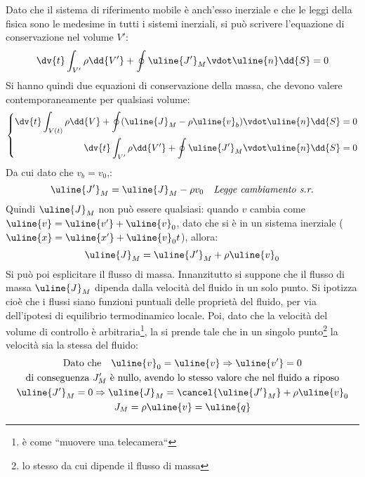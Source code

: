 Dato che il sistema di riferimento mobile è anch'esso inerziale e che le leggi della fisica sono le medesime in tutti i sistemi inerziali, si può scrivere l'equazione di conservazione nel volume $V'$:
%
	\begin{equation*}
		\dv{t} \int_{V'} \rho \dd{V'} + \oint \uline{J'}_M \vdot \uline{n} \dd{S} = 0
	\end{equation*}
%
Si hanno quindi due equazioni di conservazione della massa, che devono valere contemporaneamente per qualsiasi volume:
%
	\begin{equation*}
		\begin{gathered}
		\left\{
			\begin{aligned}
				\dv{t} \int_{V(t)} \rho \dd{V} + \oint (\uline{J}_M - \rho \uline{v}_b) \vdot \uline{n} \dd{S} = 0\\
				\dv{t} \int_{V'} \rho \dd{V'} + \oint \uline{J'}_M \vdot \uline{n} \dd{S} = 0
			\end{aligned}
		\right.
		\end{gathered}
	\end{equation*}
%
Da cui dato che $v_b = v_0$,:
%
	\begin{equation*}
		\uline{J'}_M = \uline{J}_M - \rho v_0 \quad \textit{Legge cambiamento s.r.}
	\end{equation*}
%
Quindi $\uline{J}_M$ non può essere qualsiasi: quando $v$ cambia come $\uline{v} = \uline{v'} + \uline{v}_0$, dato che si è in un sistema inerziale ($\uline{x} = \uline{x'} + \uline{v}_0 t$), allora:
%
	\begin{equation*}
		\uline{J}_M = \uline{J'}_M + \rho \uline{v}_0
	\end{equation*}
%
Si può poi esplicitare il flusso di massa.
Innanzitutto si suppone che il flusso di massa $\uline{J}_M$ dipenda dalla velocità del fluido in un solo punto.
Si ipotizza cioè che i flussi siano funzioni puntuali delle proprietà del fluido, per via dell'ipotesi di equilibrio termodinamico locale.
Poi, dato che la velocità del volume di controllo è arbitraria\footnote{è come ``muovere una telecamera``}, la si prende tale che in un singolo punto\footnote{lo stesso da cui dipende il flusso di massa} la velocità sia la stessa del fluido:
%
	\begin{equation*}
		\begin{gathered}
			\text{Dato che} \quad \uline{v}_0 = \uline{v} \Rightarrow \uline{v'} = 0 \\
			\text{di conseguenza $J'_M$ è nullo, avendo lo stesso valore che nel fluido a riposo} \\
			\uline{J'}_M = 0 \Rightarrow \uline{J}_M = \cancel{\uline{J'}_M} + \rho \uline{v}_0\\
			{J}_M = \rho \uline{v} = \uline{q}
		\end{gathered}
	\end{equation*}


